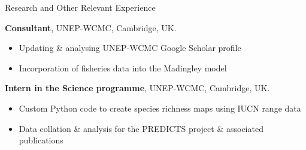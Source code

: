 \begin{rubric}{Research and Other Relevant Experience}
\begin{itemize}[topsep=0pt,itemsep=-1ex,partopsep=1ex,parsep=1ex]
	\end{itemize}
\entry*[2013 -- 2014]%
	\textbf{Consultant}, UNEP-WCMC, Cambridge, UK.
	\begin{itemize}[topsep=0pt,itemsep=-1ex,partopsep=1ex,parsep=1ex]
	\item Updating \& analysing UNEP-WCMC Google Scholar profile
	\item Incorporation of fisheries data into the Madingley model
	\end{itemize}
\entry*[2013]%
	\textbf{Intern in the Science programme}, UNEP-WCMC, Cambridge, UK.
	\begin{itemize}[topsep=0pt,itemsep=-1ex,partopsep=1ex,parsep=1ex]
	\item Custom Python code to create species richness maps using IUCN range data
	\item  Data collation \& analysis for the PREDICTS project \& associated publications \parencite{newbold_global_2015, hudson_predicts_2014, hudson_database_2017}
	\end{itemize}
%
\end{rubric}